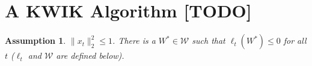 \documentclass{article}
\newcommand{\e}{\mathbf{e}}
\newtheorem{assumption}{Assumption}
\DeclareMathOperator*{\argmax}{\arg\!\max}
\begin{document}






\section{A KWIK Algorithm {\color{red} [TODO]}}
\label{sec:kwik}
\begin{assumption}
$\|x_t\|_2^2\leq 1$. There is a $W^*\in\mathcal{W}$ such that $\ell_t(W^*)\leq 0$ for all $t$ ($\ell_t$ and $\mathcal{W}$ are defined below).  
\end{assumption}
\end{document}
